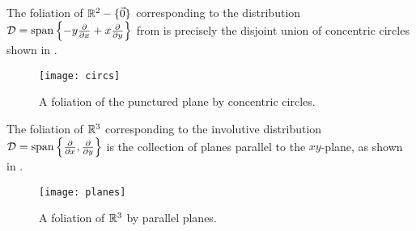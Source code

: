 \begin{example}
	The foliation of $\mathbb{R}^2 - \{\vec{0}\}$ corresponding to the distribution $\mathcal{D} = \operatorname{span}\left\{-y \frac{\partial}{\partial x} + x \frac{\partial}{\partial y}\right\}$ from  is precisely the disjoint union of concentric circles shown in .
	\begin{figure}[htbp]
		\centering
			\texttt{[image: circs]}
		\caption{A foliation of the punctured plane by concentric circles.}
		\label{fig:circs}
	\end{figure}
\end{example}



\begin{example}
	The foliation of $\mathbb{R}^3$ corresponding to the involutive distribution $\mathcal{D} = \operatorname{span} \left\{ \frac{\partial}{\partial x}, \frac{\partial}{\partial y} \right\}$ is the collection of planes parallel to the $xy$-plane, as shown in .
	\begin{figure}[htbp]
		\centering
			\texttt{[image: planes]}
		\caption{A foliation of $\mathbb{R}^3$ by parallel planes.}
		\label{fig:planes}
	\end{figure}
\end{example}

